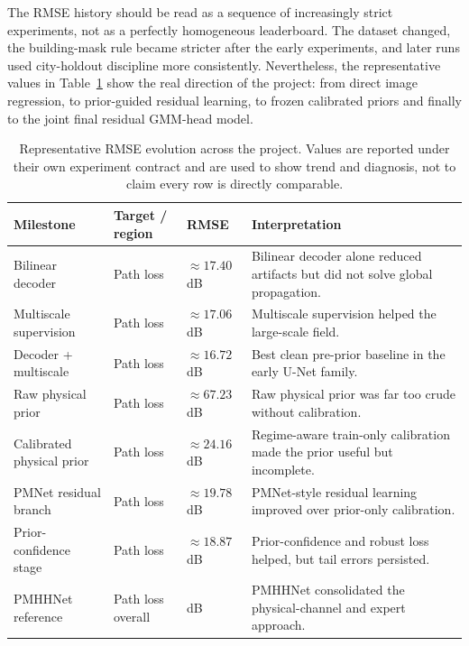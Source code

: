 The RMSE history should be read as a sequence of increasingly strict
experiments, not as a perfectly homogeneous leaderboard. The dataset changed,
the building-mask rule became stricter after the early experiments, and later
runs used city-holdout discipline more consistently. Nevertheless, the
representative values in Table~\ref{tab:rmse_evolution} show the real
direction of the project: from direct image regression, to prior-guided
residual learning, to frozen calibrated priors and finally to the joint final
residual GMM-head model.

\begin{table}[H]
\centering
\caption[Representative RMSE evolution across the project.]%
{Representative RMSE evolution across the project. Values are reported
under their own experiment contract and are used to show trend and diagnosis,
not to claim every row is directly comparable.}
\label{tab:rmse_evolution}
\small
\setlength{\tabcolsep}{3pt}
\begin{tabularx}{\textwidth}{@{}
  >{\raggedright\arraybackslash}p{2.2cm}
  >{\raggedright\arraybackslash}p{2.6cm}
  >{\raggedright\arraybackslash}p{3.0cm}
  >{\raggedright\arraybackslash}X
@{}}
\toprule
Milestone & Target / region & RMSE & Interpretation \\
\midrule
Bilinear decoder & Path loss & \(\approx 17.40\) dB & Bilinear decoder alone reduced artifacts but did not solve global propagation. \\
Multiscale supervision & Path loss & \(\approx 17.06\) dB & Multiscale supervision helped the large-scale field. \\
Decoder + multiscale & Path loss & \(\approx 16.72\) dB & Best clean pre-prior baseline in the early U-Net family. \\
Raw physical prior & Path loss & \(\approx 67.23\) dB & Raw physical prior was far too crude without calibration. \\
Calibrated physical prior & Path loss & \(\approx 24.16\) dB & Regime-aware train-only calibration made the prior useful but incomplete. \\
PMNet residual branch & Path loss & \(\approx 19.78\) dB & PMNet-style residual learning improved over prior-only calibration. \\
Prior-confidence stage & Path loss & \(\approx 18.87\) dB & Prior-confidence and robust loss helped, but tail errors persisted. \\
PMHHNet reference & Path loss overall & 9.41 dB & PMHHNet consolidated the physical-channel and expert approach. \\

\end{tabularx}
\end{table}
